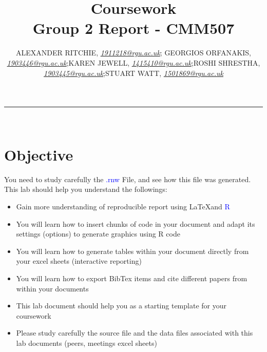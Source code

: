 \documentclass[10pt]{article}\usepackage[]{graphicx}\usepackage[]{color}
\begin{document}


\title{\LARGE Coursework  \\ Group 2 Report - CMM507}

\author{ALEXANDER RITCHIE, \textit{\href{1911218@rgu.ac.uk}{1911218@rgu.ac.uk}}; GEORGIOS ORFANAKIS, \textit{\href{1903446@rgu.ac.uk}{1903446@rgu.ac.uk}};KAREN JEWELL, \textit{\href{1415410@rgu.ac.uk}{1415410@rgu.ac.uk}};ROSHI SHRESTHA, \textit{\href{1903445@rgu.ac.uk}{1903445@rgu.ac.uk}};STUART WATT, \textit{\href{1501869@rgu.ac.uk}{1501869@rgu.ac.uk}}}

\maketitle
\noindent\rule{16cm}{0.4pt}
\ \\

\section*{Objective}

You need to study carefully the \textcolor{blue}{.rnw} File, and see how this file was generated. This lab should help you understand the followings:

\begin{itemize}
\item Gain more understanding of reproducible report using \LaTeX and \textcolor{blue}{R}
\item You will learn how to insert chunks of code in your document and adapt its settings (options) to generate graphics using R code 
\item You will learn how to generate tables within your document directly from your excel sheets (interactive reporting)
\item You will learn how to export BibTex items and cite different papers from within your documents 
\item This lab document should help you as a starting template for your coursework
\item Please study carefully the source file and the data files associated with this lab documents (peers, meetings excel sheets)

\end{itemize}
\end{document}
